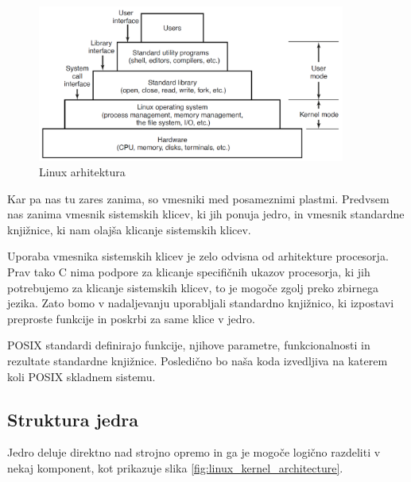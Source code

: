 \documentclass[a4paper,12pt,openright]{book}
\begin{document}
\begin{figure}[h!]
	\begin{center}
		\includegraphics[width=0.9\textwidth]{images/linux_layers.png}
	\end{center}
	\caption{Linux arhitektura \cite{Tanenbaum_Bos_2023}}
	\label{fig:linux_architecture}
\end{figure}

Kar pa nas tu zares zanima, so vmesniki med posameznimi plastmi.
Predvsem nas zanima vmesnik sistemskih klicev, ki jih ponuja jedro, in vmesnik standardne knjižnice, ki nam olajša klicanje sistemskih klicev.

Uporaba vmesnika sistemskih klicev je zelo odvisna od arhitekture procesorja.
Prav tako C nima podpore za klicanje specifičnih ukazov procesorja, ki jih potrebujemo za klicanje sistemskih klicev, to je mogoče zgolj preko zbirnega jezika.
Zato bomo v nadaljevanju uporabljali standardno knjižnico, ki izpostavi preproste funkcije in poskrbi za same klice v jedro.

POSIX standardi definirajo funkcije, njihove parametre, funkcionalnosti in rezultate standardne knjižnice.
Posledično bo naša koda izvedljiva na katerem koli POSIX skladnem sistemu.
\cite{Tanenbaum_Bos_2023}

\subsection{Struktura jedra}

Jedro deluje direktno nad strojno opremo in ga je mogoče logično razdeliti v nekaj komponent, kot prikazuje slika \ref{fig:linux_kernel_architecture}.
\end{document}

